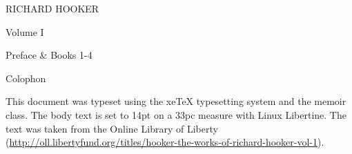 \documentclass[a4paper,14pt,extrafontsizes]{memoir}
\begin{document}
\frontmatter


\pagestyle{empty}
\begin{center}
  \LARGE{RICHARD HOOKER} \par \vspace{1.2in} 
   \par \vspace{0.2in}
   \par \vspace{0.2in}
   \par \vspace{1.5in}
  \LARGE{Volume I}  \par \vspace{0.2in}
  \LARGE{Preface \& Books 1-4}
\end{center}

\cleardoublepage
{}
\pagestyle{headings}
\tableofcontents*   %


\mainmatter
{}
\pagestyle{ocd}









\backmatter
\cleardoublepage
\pagestyle{empty}
\null\vfil

\begin{adjustwidth}{1in}{1in}
\begin{center}
{\Large\textsf{Colophon}}
\end{center}
\begin{center}
  This document was typeset using the xeTeX typesetting system
  and the memoir class. The body text is set to 14pt on a
  33pc measure with Linux Libertine. The text was taken from the
  Online Library of Liberty
  (\url{http://oll.libertyfund.org/titles/hooker-the-works-of-richard-hooker-vol-1}).
\end{center}
\end{adjustwidth}
 {}  %

\vfil
\end{document}
